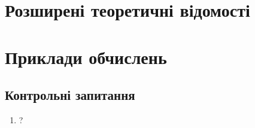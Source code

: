 \section{Розширені теоретичні відомості}
\nopagebreak[4]




\section{Приклади обчислень}
\nopagebreak[4]




\subsection*{Контрольні запитання}
\nopagebreak[4]
\begin{enumerate}
\item ?
\end{enumerate}



